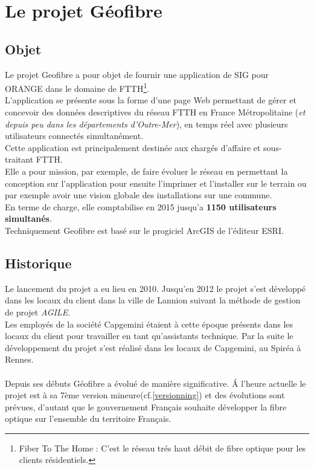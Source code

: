 \chapter{Le projet Géofibre}
\section{Objet}
Le projet Geofibre a pour objet de fournir une application de SIG pour ORANGE dans le domaine de FTTH\footnote{Fiber To The Home : C'est le réseau trés haut débit de fibre optique pour les clients résidentiels.}.\\
L'application se présente sous la forme d'une page Web permettant de gérer et concevoir des données descriptives du réseau FTTH en France Métropolitaine (\textit{et depuis peu dans les départements d'Outre-Mer}), en temps réel avec plusieurs utilisateurs connectés simultanément.\\
Cette application est principalement destinée aux chargés d'affaire et sous-traitant FTTH.\\
Elle a pour mission, par exemple, de faire évoluer le réseau en permettant la conception sur l'application pour ensuite l'imprimer et l'installer sur le terrain ou par exemple avoir une vision globale des installations sur une commune.\\
En terme de charge, elle comptabilise en 2015 jusqu'a \textbf{1150 utilisateurs simultanés}.\\
Techniquement Geofibre est basé sur le progiciel ArcGIS de l'éditeur ESRI.

\newpage
\section{Historique}
Le lancement du projet a eu lieu en 2010. Jusqu'en 2012 le projet s'est développé dans les locaux du client dans la ville de Lannion suivant la méthode de gestion de projet \textit{AGILE}.\\
Les employés de la société Capgemini étaient à cette époque présents dans les locaux du client pour travailler en tant qu'assistants technique.
Par la suite le développement du projet s'est réalisé dans les locaux de Capgemini, au Spiréa à Rennes.\\\\
Depuis ses débuts Géofibre a évolué de manière significative. \'A l'heure actuelle le projet est à sa 7ème version mineure(cf.\ref{versionning}) et des évolutions sont prévues, d'autant que le gouvernement Français souhaite développer la fibre optique sur l'ensemble du territoire Français.

